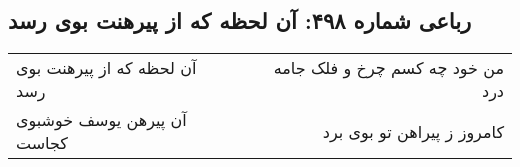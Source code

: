 \begin{center}
\section*{رباعی شماره ۴۹۸: آن لحظه که از پیرهنت بوی رسد}
\label{sec:0498}
\begin{longtable}{l p{0.5cm} r}
آن لحظه که از پیرهنت بوی رسد
&&
من خود چه کسم چرخ و فلک جامه درد
\\
آن پیرهن یوسف خوشبوی کجاست
&&
کامروز ز پیراهن تو بوی برد
\\
\end{longtable}
\end{center}
